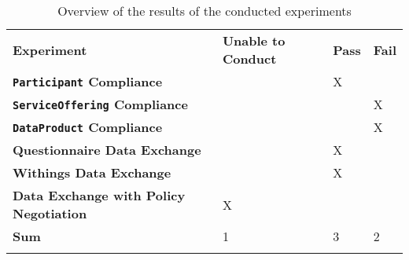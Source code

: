 \begin{longtable}{ |p{7cm}|p{3.5cm}|p{1cm}|p{1cm}| }
	\hhline{----}
	\textbf{Experiment} & \textbf{Unable to Conduct} & \textbf{Pass} & \textbf{Fail}\\
	\hhline{----}
	\textbf{\texttt{Participant} Compliance} &&X&\\
	\hhline{----}
	\textbf{\texttt{ServiceOffering} Compliance} &&&X\\
	\hhline{----}
	\textbf{\texttt{DataProduct} Compliance} &&&X\\
	\hhline{----}
	\textbf{Questionnaire Data Exchange} &&X&\\
	\hhline{----}
	\textbf{Withings Data Exchange} &&X&\\
	\hhline{----}
	\textbf{Data Exchange with Policy Negotiation} &X&&\\
	\hhline{----}
	\textbf{Sum} &1&3&2\\
	\hhline{----}
	\caption{Overview of the results of the conducted experiments}
	\label{tab:results}
\end{longtable}
